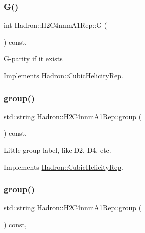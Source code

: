 \subsubsection{\texorpdfstring{G()}{G()}\hspace{0.1cm}{\footnotesize\ttfamily [3/3]}}
{\footnotesize\ttfamily int Hadron\+::\+H2\+C4nnm\+A1\+Rep\+::G (\begin{DoxyParamCaption}{ }\end{DoxyParamCaption}) const\hspace{0.3cm}{\ttfamily [inline]}, {\ttfamily [virtual]}}

G-\/parity if it exists 

Implements \mbox{\hyperlink{structHadron_1_1CubicHelicityRep_a50689f42be1e6170aa8cf6ad0597018b}{Hadron\+::\+Cubic\+Helicity\+Rep}}.

\mbox{\label{structHadron_1_1H2C4nnmA1Rep_a857a824d79d2b5d7bf3b4e4641f171cb}} 
\subsubsection{\texorpdfstring{group()}{group()}\hspace{0.1cm}{\footnotesize\ttfamily [1/5]}}
{\footnotesize\ttfamily std\+::string Hadron\+::\+H2\+C4nnm\+A1\+Rep\+::group (\begin{DoxyParamCaption}{ }\end{DoxyParamCaption}) const\hspace{0.3cm}{\ttfamily [inline]}, {\ttfamily [virtual]}}

Little-\/group label, like D2, D4, etc. 

Implements \mbox{\hyperlink{structHadron_1_1CubicHelicityRep_a101a7d76cd8ccdad0f272db44b766113}{Hadron\+::\+Cubic\+Helicity\+Rep}}.

\mbox{\label{structHadron_1_1H2C4nnmA1Rep_a857a824d79d2b5d7bf3b4e4641f171cb}} 
\subsubsection{\texorpdfstring{group()}{group()}\hspace{0.1cm}{\footnotesize\ttfamily [2/5]}}
{\footnotesize\ttfamily std\+::string Hadron\+::\+H2\+C4nnm\+A1\+Rep\+::group (\begin{DoxyParamCaption}{ }\end{DoxyParamCaption}) const\hspace{0.3cm}{\ttfamily [inline]}, {\ttfamily [virtual]}}

